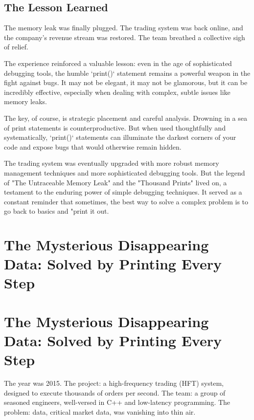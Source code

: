 \documentclass{article}
\begin{document}
{{{{\subsection*{The Lesson Learned}

The memory leak was finally plugged. The trading system was back online, and the company's revenue stream was restored. The team breathed a collective sigh of relief.

The experience reinforced a valuable lesson: even in the age of sophisticated debugging tools, the humble `print()` statement remains a powerful weapon in the fight against bugs. It may not be elegant, it may not be glamorous, but it can be incredibly effective, especially when dealing with complex, subtle issues like memory leaks.

The key, of course, is strategic placement and careful analysis. Drowning in a sea of print statements is counterproductive. But when used thoughtfully and systematically, `print()` statements can illuminate the darkest corners of your code and expose bugs that would otherwise remain hidden.

The trading system was eventually upgraded with more robust memory management techniques and more sophisticated debugging tools. But the legend of "The Untraceable Memory Leak" and the "Thousand Prints" lived on, a testament to the enduring power of simple debugging techniques. It served as a constant reminder that sometimes, the best way to solve a complex problem is to go back to basics and "print it out.

\newpage

\section*{The Mysterious Disappearing Data: Solved by Printing Every Step} %
\label{chapter-8-7-The_Mysterious_Disappearing_Data__Solved}

\section*{The Mysterious Disappearing Data: Solved by Printing Every Step}

The year was 2015. The project: a high-frequency trading (HFT) system, designed to execute thousands of orders per second. The team: a group of seasoned engineers, well-versed in C++ and low-latency programming. The problem: data, critical market data, was vanishing into thin air.

}}}}
\end{document}
